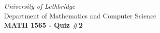 \documentclass[12pt]{article}
\newcommand{\skipline}{\vspace{12pt}}
\begin{document}
\author{Instructor: Sean Fitzpatrick}
\thispagestyle{empty}
\begin{center}
\emph{University of Lethbridge}\\
Department of Mathematics and Computer Science\\
{\bf MATH 1565 - Quiz \#2}\\
\end{center}



\vspace{0.1in}

\vspace*{\fill}
\end{document}
